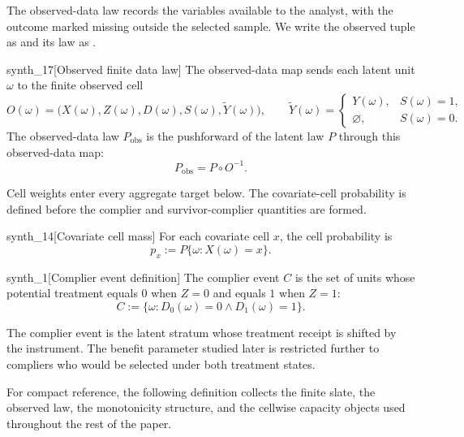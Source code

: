 \documentclass[11pt]{article}
\begin{document}
The observed-data law records the variables available to the analyst, with the outcome marked missing outside the selected sample. We write the observed tuple as  and its law as .

\begin{definitionv}{synth_17}[Observed finite data law]
The observed-data map sends each latent unit \(\omega\) to the finite observed cell
\[
O(\omega)
=
\bigl(X(\omega),Z(\omega),D(\omega),S(\omega),\widetilde Y(\omega)\bigr),
\qquad
\widetilde Y(\omega)
=
\begin{cases}
Y(\omega), & S(\omega)=1,\\
\varnothing, & S(\omega)=0.
\end{cases}
\]
The observed-data law \(P_{\mathrm{obs}}\) is the pushforward of the latent law \(P\) through this observed-data map:
\[
P_{\mathrm{obs}}=P\circ O^{-1}.
\]
\end{definitionv}

Cell weights enter every aggregate target below. The covariate-cell probability  is defined before the complier and survivor-complier quantities are formed.

\begin{definitionv}{synth_14}[Covariate cell mass]
For each covariate cell \(x\), the cell probability is
\[
p_x := P\{\omega : X(\omega)=x\}.
\]
\end{definitionv}

\begin{definitionv}{synth_1}[Complier event definition]
The complier event \(C\) is the set of units whose potential treatment equals \(0\) when \(Z=0\) and equals \(1\) when \(Z=1\):
\[
C := \{\omega : D_0(\omega)=0 \land D_1(\omega)=1\}.
\]
\end{definitionv}

The complier event  is the latent stratum whose treatment receipt is shifted by the instrument. The benefit parameter studied later is restricted further to compliers who would be selected under both treatment states.

For compact reference, the following definition collects the finite slate, the observed law, the monotonicity structure, and the cellwise capacity objects used throughout the rest of the paper.
\end{document}
